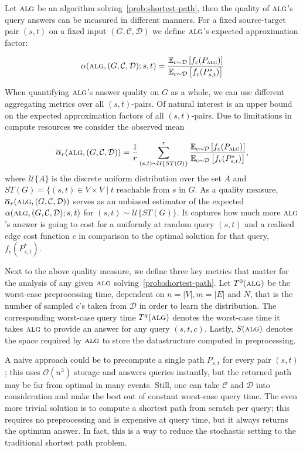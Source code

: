 Let $\textsc{alg}$ be an algorithm solving~\cref{prob:shortest-path}, then the quality of $\textsc{alg}$'s query answers can be measured in different manners. For a fixed source-target pair $(s,t)$ on a fixed input $(G, \mathcal C, \mathcal D)$ we define $\textsc{alg}$'s expected approximation factor:

\[
\alpha (\textsc{alg}, (G, \mathcal C, \mathcal D); s, t) = \frac{\mathbb{E}_{c \sim \mathcal D}\left[ f_c(P_{\textsc{alg}})\right]}{\mathbb{E}_{c \sim \mathcal D}\left[f_c(P^*_{s,t})\right]}
\]

When quantifying $\textsc{alg}$'s answer quality on $G$ as a whole, we can use different aggregating metrics over all $(s,t)$-pairs. Of natural interest is an upper bound on the expected approximation factors of all $(s,t)$-pairs. Due to limitations in compute resources we consider the observed mean

\[
\overline\alpha_r (\textsc{alg}, (G, \mathcal C, \mathcal D)) = \frac1r \sum_{(s, t) \sim \mathcal{U}\{ST(G)\}}^r\frac{\mathbb{E}_{c \sim \mathcal D}\left[ f_c(P_{\textsc{alg}})\right]}{\mathbb{E}_{c \sim \mathcal D}\left[f_c(P^*_{s,t})\right]},
\]
where $\mathcal U\{A\}$ is the discrete uniform distribution over the set $A$ and $ST(G) = \{(s,t) \in V\times V\mid t\text{ reachable from }s\text{ in }G$. As a quality measure, $\overline\alpha_r (\textsc{alg}, (G, \mathcal C, \mathcal D))$ serves as an unbiased estimator of the expected $\alpha(\textsc{alg}, (G, \mathcal C, \mathcal D); s, t)$ for $(s, t) \sim \mathcal U\{ST(G)\}$.
It captures how much more $\textsc{alg}$'s answer is going to cost for a uniformly at random query $(s, t)$ and a realised edge cost function $c$ in comparison to the optimal solution for that query, $f_c(P^*_{s, t})$.

Next to the above quality measure, we define three key metrics that matter for the analysis of any given $\textsc{alg}$ solving~\cref{prob:shortest-path}. Let $T^0(\textsc{alg})$ be the worst-case preprocessing time, dependent on $n = |V|, m = |E|$ and $N$, that is the number of sampled $c$'s taken from $\mathcal D$ in order to learn the distribution. The corresponding worst-case query time $T^q(\textsc{alg})$ denotes the worst-case time it takes $\textsc{alg}$ to provide an answer for any query $(s, t, c)$. Lastly, $S(\textsc{alg})$ denotes the space required by $\textsc{alg}$ to store the datastructure computed in preprocessing.

A naive approach could be to precompute a single path $P_{s,t}$ for every pair $(s, t)$; this uses $\mathcal O(n^3)$ storage and answers queries instantly, but the returned path may be far from optimal in many events. Still, one can take $\mathcal C$ and $\mathcal D$ into consideration and make the best out of constant worst-case query time.
The even more trivial solution is to compute a shortest path from scratch per query; this requires no preprocessing and is expensive at query time, but it always returns the optimum answer. In fact, this is a way to reduce the stochastic setting to the traditional shortest path problem.

